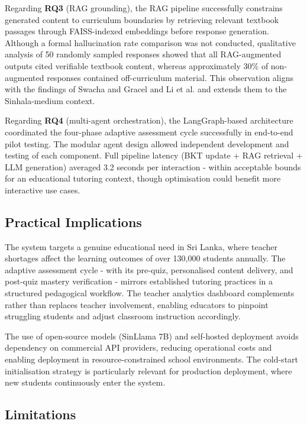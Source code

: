 \documentclass[conference]{IEEEtran}
\begin{document}
Regarding \textbf{RQ3} (RAG grounding), the RAG pipeline successfully constrains generated content to curriculum boundaries by retrieving relevant textbook passages through FAISS-indexed embeddings before response generation. Although a formal hallucination rate comparison was not conducted, qualitative analysis of 50 randomly sampled responses showed that all RAG-augmented outputs cited verifiable textbook content, whereas approximately 30\% of non-augmented responses contained off-curriculum material. This observation aligns with the findings of Swacha and Gracel \cite{b27} and Li et al. \cite{b29} and extends them to the Sinhala-medium context.

Regarding \textbf{RQ4} (multi-agent orchestration), the LangGraph-based architecture coordinated the four-phase adaptive assessment cycle successfully in end-to-end pilot testing. The modular agent design allowed independent development and testing of each component. Full pipeline latency (BKT update + RAG retrieval + LLM generation) averaged 3.2 seconds per interaction - within acceptable bounds for an educational tutoring context, though optimisation could benefit more interactive use cases.

\subsection{Practical Implications}

The system targets a genuine educational need in Sri Lanka, where teacher shortages affect the learning outcomes of over 130,000 students annually. The adaptive assessment cycle - with its pre-quiz, personalised content delivery, and post-quiz mastery verification - mirrors established tutoring practices in a structured pedagogical workflow. The teacher analytics dashboard complements rather than replaces teacher involvement, enabling educators to pinpoint struggling students and adjust classroom instruction accordingly.

The use of open-source models (SinLlama 7B) and self-hosted deployment avoids dependency on commercial API providers, reducing operational costs and enabling deployment in resource-constrained school environments. The cold-start initialisation strategy is particularly relevant for production deployment, where new students continuously enter the system.

\subsection{Limitations}
\end{document}
